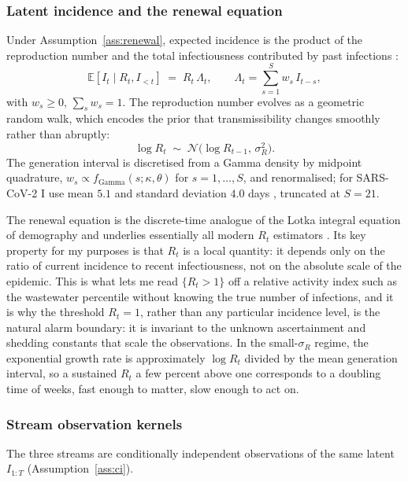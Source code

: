 \documentclass[10pt,twocolumn]{article}
\theoremstyle{definition}
\newcommand{\Rt}{R_t}
\newcommand{\E}{\mathbb{E}}
\newcommand{\Gam}{\mathrm{Gamma}}
\begin{document}
\subsubsection{Latent incidence and the renewal equation}
Under Assumption~\ref{ass:renewal}, expected incidence is the product of the
reproduction number and the total infectiousness contributed by past infections
\citep{wallinga2004,cori2013}:
\begin{equation}
\E[I_t \mid \Rt, I_{<t}] \;=\; \Rt \, \Lambda_t,
\qquad \Lambda_t = \sum_{s=1}^{S} w_s\, I_{t-s},
\label{eq:renewal}
\end{equation}
with $w_s\ge 0$, $\sum_s w_s = 1$. The reproduction number evolves as a
geometric random walk, which encodes the prior that transmissibility changes
smoothly rather than abruptly:
\begin{equation}
\log \Rt \;\sim\; \mathcal N\!\big(\log R_{t-1},\, \sigma_R^2\big).
\label{eq:rw}
\end{equation}
The generation interval is discretised from a Gamma density by midpoint
quadrature, $w_s \propto f_{\Gam}(s;\kappa,\theta)$ for $s=1,\dots,S$, and
renormalised; for SARS-CoV-2 I use mean $5.1$ and standard deviation $4.0$ days
\citep{he2020}, truncated at $S=21$.

The renewal equation is the discrete-time analogue of the Lotka integral equation
of demography and underlies essentially all modern $\Rt$ estimators
\citep{wallinga2004,fraser2007,cori2013}. Its key property for my purposes is
that $\Rt$ is a local quantity: it depends only on the ratio of current
incidence to recent infectiousness, not on the absolute scale of the epidemic.
This is what lets me read $\{\Rt>1\}$ off a relative activity index such as the
wastewater percentile without knowing the true number of infections, and it is
why the threshold $\Rt=1$, rather than any particular incidence level, is the
natural alarm boundary: it is invariant to the unknown ascertainment and shedding
constants that scale the observations. In the small-$\sigma_R$ regime, the
exponential growth rate is approximately $\log\Rt$ divided by the mean generation
interval, so a sustained $\Rt$ a few percent above one corresponds to a doubling
time of weeks, fast enough to matter, slow enough to act on.

\subsubsection{Stream observation kernels}
The three streams are conditionally independent observations of the same latent
$I_{1:T}$ (Assumption~\ref{ass:ci}).
\end{document}
